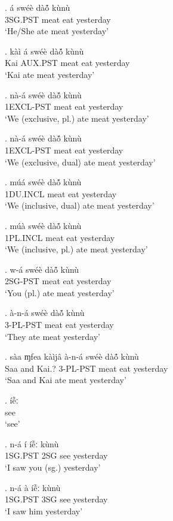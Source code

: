 \documentclass{assets/fieldnotes}
\begin{document}
{\exg. á swéè dàó̃ kùnù\\
3SG.PST meat eat yesterday \\%
    `He/She ate meat yesterday'

\exg. kàì á swéè dàó̃ kùnù\\
Kai AUX.PST meat eat yesterday \\%
    `Kai ate meat yesterday'

\exg. nà-á swéè dàó̃ kùnù\\
1EXCL-PST meat eat yesterday \\
    `We (exclusive, pl.) ate meat yesterday'

\exg. nà-á swéè dàó̃ kùnù\\
1EXCL-PST meat eat yesterday\\
    `We (exclusive, dual) ate meat yesterday'

\exg. múá swéè dàó̃ kùnù\\
1DU.INCL meat eat yesterday \\
    `We (inclusive, dual) ate meat yesterday'

\exg. múà swéè dàó̃ kùnù\\
1PL.INCL meat eat yesterday \\
    `We (inclusive, pl.) ate meat yesterday'

\exg. w-á swéè dàó̃ kùnù\\
2SG-PST meat eat yesterday \\
    `You (pl.) ate meat yesterday'

\exg. à-n-á swéè dàó̃ kùnù\\
3-PL-PST meat eat yesterday \\
    `They ate meat yesterday'

\exg. sàa ɱfea kàìjâ à-n-á swéè dàó̃ kùnù\\
Saa and Kai.? 3-PL-PST meat eat yesterday \\
    `Saa and Kai ate meat yesterday'

\exg. íễː\\
see\\
    `see'

\exg. n-á í íễː kùnù\\
1SG.PST 2SG see yesterday \\
    `I saw you (sg.) yesterday'

\exg. n-á à íễː kùnù\\
1SG.PST 3SG see yesterday \\
    `I saw him yesterday'

}
\end{document}
